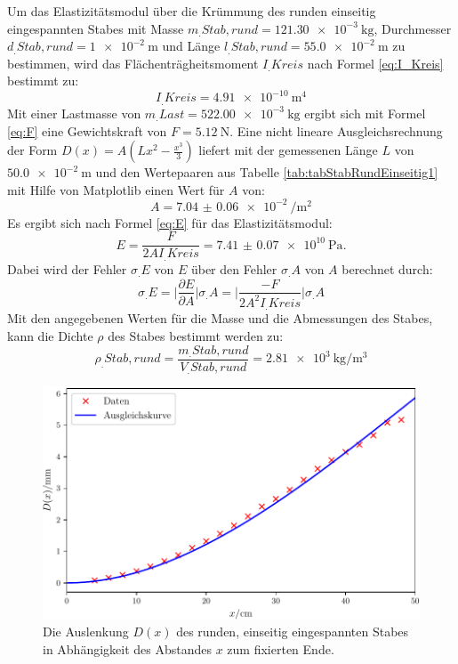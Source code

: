 Um das Elastizitätsmodul über die Krümmung des runden einseitig eingespannten Stabes mit Masse $m_.{Stab,rund} = \SI{121,30e-3}{\kilogram}$, Durchmesser $d_.{Stab,rund} = \SI{1e-2}{\metre}$ und Länge $l_.{Stab,rund}=\SI{55,0e-2}{\metre}$ zu bestimmen, wird das Flächenträgheitsmoment $I_.{Kreis}$ nach Formel \eqref{eq:I_Kreis} bestimmt zu:
\[
	I_.{Kreis}=\SI{4.91e-10}{\metre\tothe{4}}
\]
Mit einer Lastmasse von $m_.{Last} = \SI{522,00e-3}{\kilogram}$ ergibt sich mit Formel \eqref{eq:F} eine Gewichtskraft von $F=\SI{5.12}{\newton}$. Eine nicht lineare Ausgleichsrechnung der Form $D(x) = A ( L x^2 - \frac{x^3}{3})$ liefert mit der gemessenen Länge $L$ von $\SI{50.0e-2}{\metre}$ und den Wertepaaren aus Tabelle \ref{tab:tabStabRundEinseitig1} mit Hilfe von Matplotlib \cite{matplotlib} einen Wert für $A$ von:
\[
	A = \SI{7.04(6)e-2}{\per\metre\squared}
\]
Es ergibt sich nach Formel \eqref{eq:E} für das Elastizitätsmodul:
\[
	E = \frac{F}{2AI_.{Kreis}} = \SI{7.41(7)e10}{\pascal}\text{.}
\]
Dabei wird der Fehler $\sigma_.E$ von $E$ über den Fehler $\sigma_.A$ von $A$ berechnet durch:
\begin{equation}
	\sigma_.E = \biggl|\frac{\partial E}{\partial A}\biggl|\sigma_.A = \biggl|\frac{-F}{2A^2I_.{Kreis}}\biggl|\sigma_.A \label{eq:sigma_E}
\end{equation}
Mit den angegebenen Werten für die Masse und die Abmessungen des Stabes, kann die Dichte $\rho$ des Stabes bestimmt werden zu:
\[
	\rho_.{Stab,rund} = \frac{m_.{Stab,rund}}{V_.{Stab,rund}}=\SI{2,81e3}{\kilogram\per\cubic\metre}
\]
\begin{figure}
	\centering
	\includegraphics[scale=.8]{content/images/StabRundEinseitig1.pdf}
	\caption{Die Auslenkung $D(x)$ des runden, einseitig eingespannten Stabes in Abhängigkeit des Abstandes $x$ zum fixierten Ende.}
	\label{fig:rund}
\end{figure}

